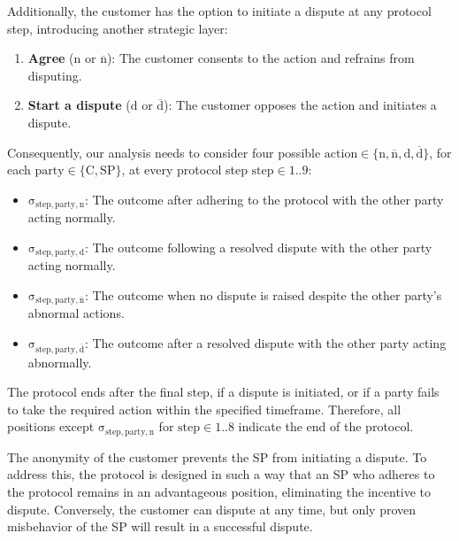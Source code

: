 \documentclass[pdftex,twocolumn,epjc3]{svjour3}
\newcommand{\normal}{\mathrm{n}}
\newcommand{\dispute}{\mathrm{d}}
\newcommand{\abnormal}{\overline{\mathrm{n}}}
\newcommand{\abdispute}{\overline{\mathrm{d}}}
\begin{document}
Additionally, the customer has the option to initiate a dispute at any protocol step, introducing another strategic layer:

\begin{enumerate}
\def\labelenumi{\arabic{enumi}.}
\item \textbf{Agree} ($\normal{}$ or $\abnormal{}$): The customer consents to the action and refrains from disputing.
\item \textbf{Start a dispute} ($\dispute{}$ or $\abdispute{}$): The customer opposes the action and initiates a dispute.
\end{enumerate}

\begin{sloppypar}
  Consequently, our analysis needs to consider four possible $\mathrm{action} \in \{ \normal{}, \abnormal{}, \dispute{}, \abdispute{} \}$, for each $\mathrm{party \in \{C, SP\} }$, at every protocol step $\mathrm{step \in 1..9}$:
\end{sloppypar}

\begin{itemize}
\item $\mathrm{\sigma_{step,party,\normal{}}}$: The outcome after adhering to the protocol with the other party acting normally.
\item $\mathrm{\sigma_{step,party,\dispute{}}}$: The outcome following a resolved dispute with the other party acting normally.
\item $\mathrm{\sigma_{step,party,\abnormal{}}}$: The outcome when no dispute is raised despite the other party's abnormal actions.
\item $\mathrm{\sigma_{step,party,\abdispute{}}}$: The outcome after a resolved dispute with the other party acting abnormally.
\end{itemize}

\begin{sloppypar}
The protocol ends after the final step, if a dispute is initiated, or if a party fails to take the required action within the specified timeframe. Therefore, all positions except $\mathrm{\sigma_{step, party, n}}$ for $\mathrm{step} \in 1..8$ indicate the end of the protocol.
\end{sloppypar}

The anonymity of the customer prevents the SP from initiating a dispute. To address this, the protocol is designed in such a way that an SP who adheres to the protocol remains in an advantageous position, eliminating the incentive to dispute. Conversely, the customer can dispute at any time, but only proven misbehavior of the SP will result in a successful dispute.
\end{document}
